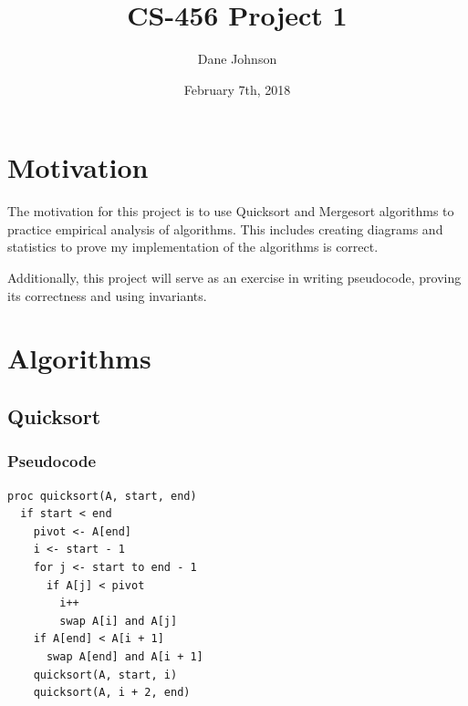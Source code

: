 \documentclass[a4paper,12pt]{article}
\title{CS-456 Project 1}
\author{Dane Johnson}
\date{February 7th, 2018}
\begin{document}
\maketitle
\newpage
\section{Motivation}

The motivation for this project is to use Quicksort and Mergesort algorithms to practice empirical analysis of algorithms.
This includes creating diagrams and statistics to prove my implementation of the algorithms is correct.

Additionally, this project will serve as an exercise in writing pseudocode, proving its correctness and using invariants.
\section{Algorithms}
\subsection{Quicksort}
\subsubsection{Pseudocode}
\begin{verbatim}
proc quicksort(A, start, end)
  if start < end
    pivot <- A[end]
    i <- start - 1 
    for j <- start to end - 1
      if A[j] < pivot
        i++
        swap A[i] and A[j]
    if A[end] < A[i + 1]
      swap A[end] and A[i + 1]
    quicksort(A, start, i)
    quicksort(A, i + 2, end)
\end{verbatim}
\end{document}
